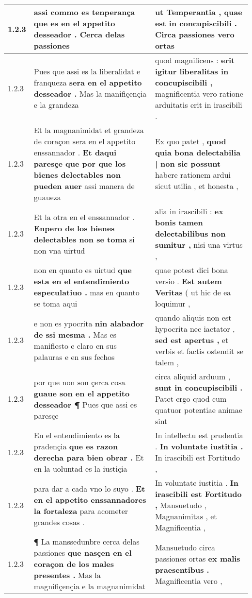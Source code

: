 \begin{tabular}{|p{1cm}|p{6.5cm}|p{6.5cm}|}
1.2.3 & assi commo es tenperança \textbf{ que es en el appetito desseador . } Cerca delas passiones & ut Temperantia , \textbf{ quae est in concupiscibili . } Circa passiones vero ortas \\\hline
1.2.3 & Pues que assi es la liberalidat e franqueza \textbf{ sera en el appetito desseador . } Mas la manifiçençia e la grandeza & quod magnificens : \textbf{ erit igitur liberalitas in concupiscibili , } magnificentia vero ratione arduitatis erit in irascibili . \\\hline
1.2.3 & Et la magnanimidat et grandeza de coraçon sera en el appetito enssannador . \textbf{ Et daqui paresçe que por que los bienes delectables non pueden auer } assi manera de guaueza & Ex quo patet , \textbf{ quod quia bona delectabilia | non sic possunt } habere rationem ardui sicut utilia , et honesta , \\\hline
1.2.3 & Et la otra en el enssannador . \textbf{ Enpero de los bienes delectables non se toma } si non vna uirtud & alia in irascibili : \textbf{ ex bonis tamen delectabilibus non sumitur , } nisi una virtus , \\\hline
1.2.3 & non en quanto es uirtud \textbf{ que esta en el entendimiento especulatiuo . } mas en quanto se toma aqui & quae potest dici bona versio . \textbf{ Est autem Veritas } ( ut hic de ea loquimur , \\\hline
1.2.3 & e non es ypocrita \textbf{ nin alabador de ssi mesma . } Mas es manifiesto e claro en sus palauras e en sus fechos & quando aliquis non est hypocrita nec iactator , \textbf{ sed est apertus , } et verbis et factis ostendit se talem , \\\hline
1.2.3 & por que non son çerca cosa \textbf{ guaue son en el appetito desseador ¶ } Pues que assi es paresçe & circa aliquid arduum , \textbf{ sunt in concupiscibili . } Patet ergo quod cum quatuor potentiae animae sint \\\hline
1.2.3 & En el entendimiento es la pradençia \textbf{ que es razon derecha para bien obrar . } Et en la uoluntad es la iustiçia & In intellectu est prudentia . \textbf{ In voluntate iustitia . } In irascibili est Fortitudo , \\\hline
1.2.3 & para dar a cada vno lo suyo . \textbf{ Et en el appetito enssannadores la fortaleza } para acometer grandes cosas . & In voluntate iustitia . \textbf{ In irascibili est Fortitudo , } Mansuetudo , Magnanimitas , et Magnificentia , \\\hline
1.2.3 & ¶ La manssedunbre cerca delas passiones \textbf{ que nasçen en el coraçon de los males presentes . } Mas la magnifiçençia e la magnanimidat & Mansuetudo circa passiones ortas \textbf{ ex malis praesentibus . } Magnificentia vero , \\\hline

\end{tabular}

